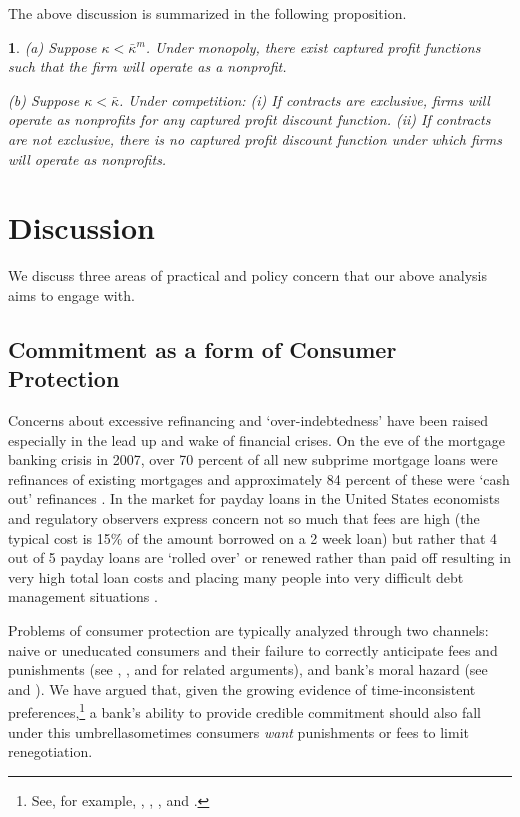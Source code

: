 \documentclass[11pt,english]{article}
\theoremstyle{plain}
\newtheorem{prop}{\protect\propositionname}
\theoremstyle{definition}
\providecommand{\propositionname}{Proposition}
\begin{document}
The above discussion is summarized in the following proposition. 
\begin{prop}
(a) Suppose $\kappa<\bar{\kappa}^{m}$. Under monopoly, there exist
captured profit functions such that the firm will operate as a nonprofit.

(b) Suppose $\kappa<\bar{\kappa}$. Under competition: (i) If contracts
are exclusive, firms will operate as nonprofits for any captured profit
discount function. (ii) If contracts are not exclusive, there is no
captured profit discount function under which firms will operate as
nonprofits. 
\end{prop}

\section{Discussion}

We discuss three areas of practical and policy concern that our above
analysis aims to engage with.

\subsection{Commitment as a form of Consumer Protection}

Concerns about excessive refinancing and `over-indebtedness' have
been raised especially in the lead up and wake of financial crises.
On the eve of the mortgage banking crisis in 2007, over 70 percent
of all new subprime mortgage loans were refinances of existing mortgages
and approximately 84 percent of these were `cash out' refinances \citep{demyanyk2011}.
In the market for payday loans in the United States economists and
regulatory observers express concern not so much that fees are high
(the typical cost is 15\% of the amount borrowed on a 2 week loan)
but rather that 4 out of 5 payday loans are `rolled over' or renewed
rather than paid off resulting in very high total loan costs and placing
many people into very difficult debt management situations \citep{deyoung2015}.

Problems of consumer protection are typically analyzed through two
channels: naive or uneducated consumers and their failure to correctly
anticipate fees and punishments (see \citet{gabaix2006},
\citet{armstrong2012}, and \citet{akerlof2015} for related arguments),
and bank's moral hazard (see \citet{dewatripont1999} and \citet{oak2010}).
We have argued that, given the growing evidence of time-inconsistent
preferences,\footnote{See, for example, \citet{laibson2003}, \citet{ashraf2006},
\citet{gugerty2007}, and \citet{tanaka2010}.} a bank's ability to provide credible commitment should also fall
under this umbrella\textendash sometimes consumers \textit{want} punishments
or fees to limit renegotiation.
\end{document}
